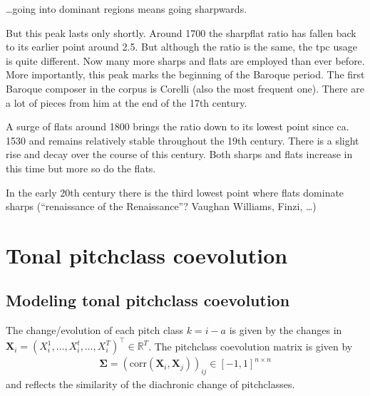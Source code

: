 \documentclass[letterpaper,10pt,english]{sphinxmanual}
\begin{document}
\sphinxAtStartPar
…going into dominant regions means going sharpwards.

\sphinxAtStartPar
But this peak lasts only shortly. Around 1700 the sharp\sphinxhyphen{}flat ratio has
fallen back to its earlier point around 2.5. But although the ratio is
the same, the tpc usage is quite different. Now many more sharps and
flats are employed than ever before. More importantly, this peak marks
the beginning of the Baroque period. The first Baroque composer in the
corpus is Corelli (also the most frequent one). There are a lot of
pieces from him at the end of the 17th century.

\sphinxAtStartPar
A surge of flats around 1800 brings the ratio down to its lowest point
since ca. 1530 and remains relatively stable throughout the 19th
century. There is a slight rise and decay over the course of this
century. Both sharps and flats increase in this time but more so do the
flats.

\sphinxAtStartPar
In the early 20th century there is the third lowest point where flats
dominate sharps (“renaissance of the Renaissance”? Vaughan Williams,
Finzi, …)


\chapter{Tonal pitch\sphinxhyphen{}class coevolution}
\label{\detokenize{5_notes:tonal-pitch-class-coevolution}}

\section{Modeling tonal pitch\sphinxhyphen{}class coevolution}
\label{\detokenize{5_notes:modeling-tonal-pitch-class-coevolution}}
\sphinxAtStartPar
The change/evolution of each pitch class \(k=i-a\) is given by the
changes in
\(\mathbf{X}_i=(X^{1}_i,\dots,X^{t}_i,\dots,X^{T}_i)^\top\in \mathbb{R}^{T}\).
The pitch\sphinxhyphen{}class coevolution matrix is given by
\begin{equation*}
\begin{split}\mathbf\Sigma=\left(\mathrm{corr}(\mathbf{X}_i, \mathbf{X}_j)\right)_{ij}\in[-1,1]^{n\times n}\end{split}
\end{equation*}
\sphinxAtStartPar
and reflects the similarity of the diachronic change of pitch\sphinxhyphen{}classes.
\end{document}
